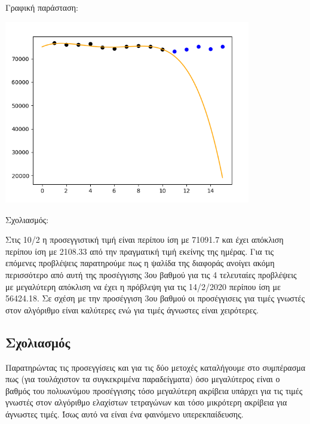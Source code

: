 \documentclass[a4paper,11pt]{article}
\begin{document}
	Γραφική παράσταση:
	
	\includegraphics[height=8cm]{eydap-4-alt.png}
	
	Σχολιασμός:
	\hfill \break
	
	Στις 10/2 η προσεγγιστική τιμή είναι περίπου ίση με 71091.7 και έχει απόκλιση περίπου ίση με 2108.33 από την πραγματική τιμή εκείνης της ημέρας. Για τις επόμενες προβλέψεις
	παρατηρούμε πως η ψαλίδα της διαφοράς ανοίγει ακόμη περισσότερο από αυτή της προσέγγισης 3ου βαθμού για τις 4 τελευταίες προβλέψεις με μεγαλύτερη απόκλιση να έχει η πρόβλεψη για τις 14/2/2020 περίπου ίση με 56424.18. Σε σχέση με την προσέγγιση 3ου βαθμού οι προσέγγισεις για τιμές γνωστές στον αλγόριθμο είναι καλύτερες ενώ για τιμές άγνωστες είναι χειρότερες.
	
	\subsection{Σχολιασμός}
	
	Παρατηρώντας τις προσεγγίσεις και για τις δύο μετοχές καταλήγουμε στο συμπέρασμα πως (για τουλάχιστον τα συγκεκριμένα παραδείγματα) όσο μεγαλύτερος είναι ο βαθμός του πολυωνύμου προσέγγισης τόσο μεγαλύτερη ακρίβεια υπάρχει για τις τιμές γνωστές στον αλγόριθμο ελαχίστων τετραγώνων και τόσο μικρότερη ακρίβεια για άγνωστες τιμές. Ίσως αυτό να είναι ένα φαινόμενο υπερεκπαίδευσης.
	
\end{document}
